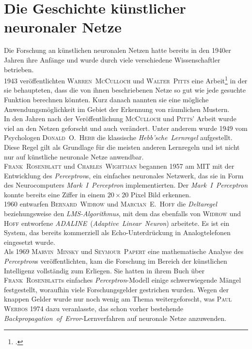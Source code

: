 \section{Die Geschichte künstlicher neuronaler Netze}\label{sec:die-geschichte}
Die Forschung an künstlichen neuronalen Netzen hatte bereits in den 1940er Jahren ihre Anfänge und wurde durch viele verschiedene Wissenschaftler betrieben.\\
1943 veröffentlichten \textsc{Warren~McCulloch} und \textsc{Walter~Pitts} eine Arbeit\footcite{mcculloch} in der sie behaupteten, dass die von ihnen beschriebenen Netze so gut wie jede gesuchte Funktion berechnen könnten.
Kurz danach nannten sie eine mögliche Anwendungsmöglichkeit im Gebiet der Erkennung von räumlichen Mustern.\\
In den Jahren nach der Veröffentlichung \textsc{McCulloch} und \textsc{Pitts}’ Arbeit wurde viel an den Netzen geforscht und auch verändert.
Unter anderem wurde 1949 vom Psychologen \textsc{Donald~O.~Hebb} die klassische \textit{Hebb'sche~Lernregel} aufgestellt.
Diese Regel gilt als Grundlage für die meisten anderen Lernregeln und ist nicht nur auf künstliche neuronale Netze anwendbar.\\
\textsc{Frank~Rosenblatt} und \textsc{Charles~Wightman} begannen 1957 am MIT mit der Entwicklung des \textit{Perceptron}s, ein einfaches neuronales Netzwerk, das sie in Form des Neurocomputers \textit{Mark~I~Perceptron} implementierten.
Der \textit{Mark~I~Perceptron} konnte bereits eine Ziffer in einem $20 \times 20$ Pixel Bild erkennen.\\
1960 entwarfen \textsc{Bernard~Widrow} und \textsc{Marcian~E.~Hoff} die \textit{Deltaregel} beziehungsweise den \textit{LMS-Algorithmus}, mit dem das ebenfalls von \textsc{Widrow} und \textsc{Hoff} entworfene \textit{ADALINE}~(\textit{Adaptive~Linear~Neuron}) arbeitete.
Es ist ein System, das bereits kommerziell als Echo-Unterdrückung in Analogtelefonen eingesetzt wurde.\\
Als 1969 \textsc{Marvin~Minsky} und \textsc{Seymour~Papert} eine mathematische Analyse des \textit{Perceptron}s veröffentlichten, kam die Forschung im Bereich der künstlichen Intelligenz vollständig zum Erliegen.
Sie hatten in ihrem Buch über \textsc{Frank~Rosenblatt}s einfaches \textit{Perceptron}-Modell einige schwerwiegende Mängel festgestellt, woraufhin viele Forschungsgelder gestrichen wurden.
Wegen der knappen Gelder wurde nur noch wenig am Thema weitergeforscht, was \textsc{Paul Werbos} 1974 dazu veranlasste, das schon vorher bestehende \textit{Backpropagation~of~Error}-Lernverfahren auf neuronale Netze anzuwenden.
